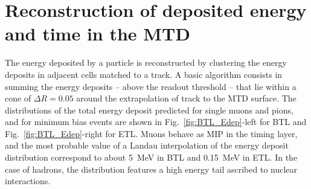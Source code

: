 \section{Reconstruction of deposited energy and time in the MTD}
\label{C5Sec:mtdreco}
The energy deposited by a particle is reconstructed by clustering the energy deposits in adjacent cells matched to a track.  
A basic algorithm consists in summing the energy deposits -- above the readout threshold -- that lie within a cone of $\Delta R = 0.05$ around the extrapolation of track to the MTD surface. 
The distributions of the total energy deposit predicted for single muons and pions, and for minimum bias events are shown in Fig.~\ref{fig:BTL_Edep}-left for BTL and Fig.~\ref{fig:BTL_Edep}-right for ETL. 
Muons behave as MIP in the timing layer, and the most probable value of a Landau interpolation of the energy deposit distribution correspond to about 5~MeV in BTL and 0.15~MeV in ETL. In the case of hadrons, the distribution features a high energy tail ascribed to nuclear interactions.

